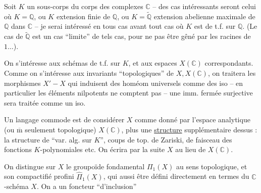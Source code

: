 Soit $K$ un sous-corps du corps des complexes $\mathbb C$ -- des cas intéressants seront celui où $K=\mathbb Q$, ou $K$ extension finie de $\mathbb Q$, ou $K=\widetilde{\mathbb Q}$ extension abelienne maximale de $\mathbb Q$ dans $\mathbb C$ -- je serai intéressé en tous cas avant tout  cas où $K$ est de t.f. sur $\mathbb Q$. (Le cas de $\widetilde{\mathbb Q}$ est un cas ``limite'' de tels cas, pour ne pas être gêné par les racines de $1\ldots$).

On s'intéresse aux schémas  de t.f. sur $K$, et aux espaces  $X(\mathbb C)$ correspondants. Comme on s'intéresse aux invariants ``topologiques'' de $X,X(\mathbb C)$, on traitera les morphismes $X'-X$ qui induisent des homéom universels comme des iso -- en particulier les éléments nilpotents ne comptent pas -- une imm. fermée surjective sera traitée comme un iso.

Un langage commode est de considérer $X$ comme donné par l'espace analytique (ou $\overline{\mathrm m}$ seulement topologique) $X(\mathbb C)$, plus une \uline{structure} supplémentaire dessus : la structure de ``var. alg. sur $K$'',  coups de top. de Zariski, de faisceau des fonctions $K$-polynomiales etc. On écrira par la suite $X$ au lieu de $X(\mathbb C)$.

On distingue sur $X$ le groupoïde fondamental $\Pi_1(X)$ au sens topologique, et son compactifié profini $\widehat\Pi_1(X)$, qui   aussi être défini directement en termes du $\mathbb C$-schéma $X$. On a un foncteur ``d'inclusion''
